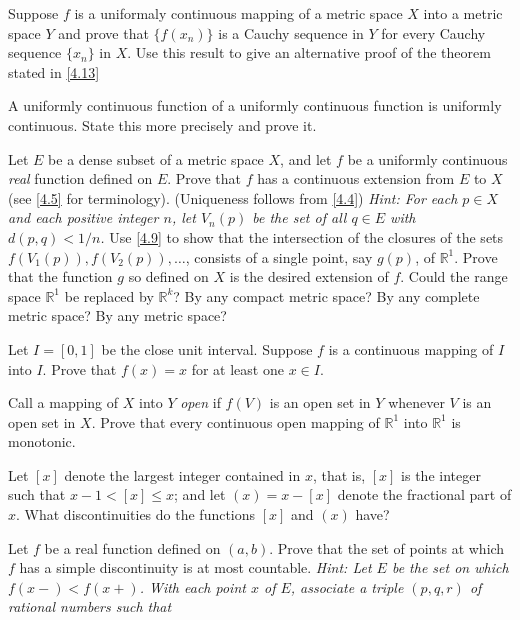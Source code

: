 \begin{exercise}
\item
  Suppose \(f\) is a uniformaly continuous mapping of a metric space \(X\)
  into a metric space \(Y\) and prove that \(\{f(x_n)\}\) is a Cauchy sequence
  in \(Y\) for every Cauchy sequence \(\{x_n\}\) in \(X\).
  Use this result to give an alternative proof of the theorem stated in
  \cref{4.13}
\item
  A uniformly continuous function of a uniformly continuous function is
  uniformly continuous.
  State this more precisely and prove it.
\item
  \label{4.13}
  Let \(E\) be a dense subset of a metric space \(X\), and let \(f\) be a
  uniformly continuous \textit{real} function defined on \(E\).
  Prove that \(f\) has a continuous extension from \(E\) to \(X\)
  (see \cref{4.5} for terminology).
  (Uniqueness follows from \cref{4.4})
  \textit{Hint: For each \(p\in X\) and each positive integer \(n\), let
    \(V_n(p)\) be the set of all \(q\in E\) with \(d(p,q) < 1/n\).}
  Use \cref{4.9} to show that the intersection of the closures of the sets
  \(f(V_1(p)),f(V_2(p)),\ldots\), consists of a single point, say \(g(p)\), of
  \(\mathbb{R}^1\).
  Prove that the function \(g\) so defined on \(X\) is the desired extension
  of \(f\).
  Could the range space \(\mathbb{R}^1\) be replaced by \(\mathbb{R}^k\)?
  By any compact metric space?
  By any complete metric space?
  By any metric space?
\item
  Let \(I = [0,1]\) be the close unit interval.
  Suppose \(f\) is a continuous mapping of \(I\) into \(I\).
  Prove that \(f(x) = x\) for at least one \(x\in I\).
\item
  Call a mapping of \(X\) into \(Y\) \textit{open} if \(f(V)\) is an open set
  in \(Y\) whenever \(V\) is an open set in \(X\).
  Prove that every continuous open mapping of \(\mathbb{R}^1\) into
  \(\mathbb{R}^1\) is monotonic.
\item
  Let \([x]\) denote the largest integer contained in \(x\), that is, \([x]\)
  is the integer such that \(x - 1 < [x]\leq x\); and let \((x) = x - [x]\)
  denote the fractional part of \(x\).
  What discontinuities do the functions \([x]\) and \((x)\) have?
\item
  Let \(f\) be a real function defined on \((a,b)\).
  Prove that the set of points at which \(f\) has a simple discontinuity is at
  most countable.
  \textit{Hint: Let \(E\) be the set on which \(f(x-) < f(x+)\).
    With each point \(x\) of \(E\), associate a triple \((p,q,r)\) of rational
    numbers such that}
  \begin{exercise}[label = (\alph*)]

\end{exercise}
\end{exercise}
